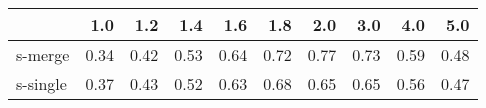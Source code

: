 \begin{tabular}{lrrrrrrrrr}
\toprule
{} &  1.0 &  1.2 &  1.4 &  1.6 &  1.8 &  2.0 &  3.0 &  4.0 &  5.0 \\
\midrule
s-merge  & 0.34 & 0.42 & 0.53 & 0.64 & 0.72 & 0.77 & 0.73 & 0.59 & 0.48 \\
s-single & 0.37 & 0.43 & 0.52 & 0.63 & 0.68 & 0.65 & 0.65 & 0.56 & 0.47 \\
\bottomrule
\end{tabular}
